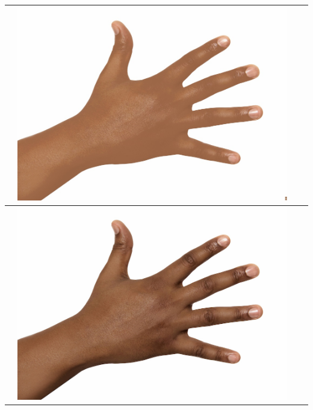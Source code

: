 \begin{longtable}{|N||c|c|c|}
\begin{minipage}{.29\textwidth}
  \end{minipage} & 
  \begin{minipage}{.29\textwidth}
    \includegraphics[width=\textwidth,height=\textheight,keepaspectratio]{../rc_test/outputs/20170517_proportional_corrected_test_alpha10/hand_dark_to_hand_brown.jpg}
  \end{minipage} \\
\hline  \label{row:prop_correct_test_a10_hand_dark_to_hand_light} &
  \begin{minipage}{.29\textwidth}
    \includegraphics[width=\textwidth,height=\textheight,keepaspectratio]{../inputs/hand_dark.jpg}
  \end{minipage} & 
  \begin{minipage}{.29\textwidth}

\end{minipage}
\end{longtable}
